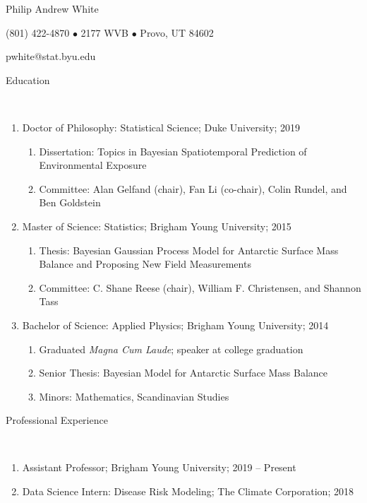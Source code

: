 \documentclass[12pt]{article}
\newcommand{\head}[1]{ %
    \bigskip %
    \begin{large}\begin{bf}{#1}\end{bf}\end{large} %

    \ \\ [-1.3cm] %

    \hrulefill}
\begin{document}

\centerline{ \LARGE Philip Andrew White }
\smallskip
\centerline{ (801) 422-4870 $\bullet$ 2177 WVB $\bullet$ Provo, UT 84602 }
\smallskip
\centerline{pwhite@stat.byu.edu }
\smallskip


\head{Education}

\begin{enumerate}[label=$\bullet$]
\item Doctor of Philosophy: Statistical Science; Duke University; 2019
\begin{enumerate}[label=$\cdot$]
\item Dissertation: Topics in Bayesian Spatiotemporal Prediction of Environmental Exposure
\item Committee: Alan Gelfand (chair), Fan Li (co-chair), Colin Rundel, and Ben Goldstein
\end{enumerate}

\item Master of Science: Statistics; Brigham Young University; 2015

\begin{enumerate}[label=$\cdot$]
\item Thesis: Bayesian Gaussian Process Model for Antarctic Surface Mass Balance and Proposing New Field Measurements
\item  Committee: C. Shane Reese (chair), William F. Christensen, and Shannon Tass
\end{enumerate}

\item Bachelor of Science: Applied Physics; Brigham Young University; 2014 

\begin{enumerate}[label=$\cdot$]
\item Graduated \emph{Magna Cum Laude}; speaker at college graduation
\item Senior Thesis: Bayesian Model for Antarctic Surface Mass Balance
\item Minors: Mathematics, Scandinavian Studies
\end{enumerate}
\end{enumerate}


\head{Professional Experience}

\begin{enumerate}[label=$\bullet$]

\item Assistant Professor; Brigham Young University; 2019 -- Present

\item Data Science Intern: Disease Risk Modeling; The Climate Corporation; 2018

\end{enumerate}
\end{document}
